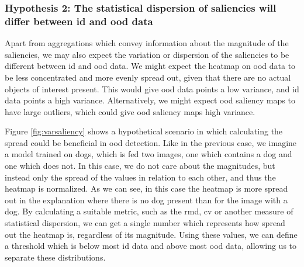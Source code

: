 \documentclass[UKenglish]{uiomasterthesis} %
\theoremstyle{definition}
\begin{document}
\subsubsection{Hypothesis 2: The statistical dispersion of saliencies will differ between \ac{id} and \ac{ood} data}

Apart from aggregations which convey information about the magnitude of the saliencies, we may also expect the variation or dispersion of the saliencies to be different between \ac{id} and \ac{ood} data. We might expect the heatmap on \ac{ood} data to be less concentrated and more evenly spread out, given that there are no actual objects of interest present. This would give \ac{ood} data points a low variance, and \ac{id} data points a high variance. Alternatively, we might expect \ac{ood} saliency maps to have large outliers, which could give \ac{ood} saliency maps high variance.

Figure \ref{fig:varsaliency} shows a hypothetical scenario in which calculating the spread could be beneficial in \ac{ood} detection. Like in the previous case, we imagine a model trained on dogs, which is fed two images, one which contains a dog and one which does not. In this case, we do not care about the magnitudes, but instead only the spread of the values in relation to each other, and thus the heatmap is normalized. As we can see, in this case the heatmap is more spread out in the explanation where there is no dog present than for the image with a dog. By calculating a suitable metric, such as the \ac{rmd}, \ac{cv} or another measure of statistical dispersion, we can get a single number which represents how spread out the heatmap is, regardless of its magnitude. Using these values, we can define a threshold which is below most \ac{id} data and above most \ac{ood} data, allowing us to separate these distributions.
\end{document}
